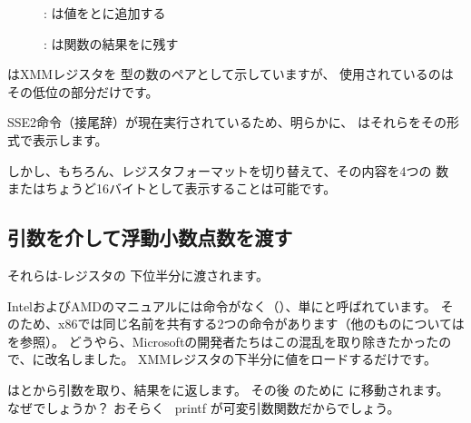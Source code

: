 \clearpage
\begin{figure}[H]
\centering
{}
\caption{\olly:  は値をとに追加する}
\label{fig:FPU_SIMD_simple_olly4}
\end{figure}

\clearpage
\begin{figure}[H]
\centering
{}
\caption{\olly: \FLD は関数の結果をに残す}
\label{fig:FPU_SIMD_simple_olly5}
\end{figure}

\olly はXMMレジスタを \Tdouble 型の数のペアとして示していますが、
使用されているのはその低位の部分だけです。

SSE2命令（接尾辞）が現在実行されているため、明らかに、
\olly はそれらをその形式で表示します。

しかし、もちろん、レジスタフォーマットを切り替えて、その内容を4つの \Tfloat{} 数
またはちょうど16バイトとして表示することは可能です。

\clearpage
\subsection{引数を介して浮動小数点数を渡す}



それらは-レジスタの
下位半分に渡されます。



IntelおよびAMDのマニュアルには命令がなく（）、単にと呼ばれています。 
そのため、x86では同じ名前を共有する2つの命令があります（他のものについては  を参照）。
どうやら、Microsoftの開発者たちはこの混乱を取り除きたかったので、に改名しました。 
XMMレジスタの下半分に値をロードするだけです。

はとから引数を取り、結果をに返します。 
その後 \printf のために \RDX に移動されます。 
なぜでしょうか？
おそらく \
printf が可変引数関数だからでしょう。



